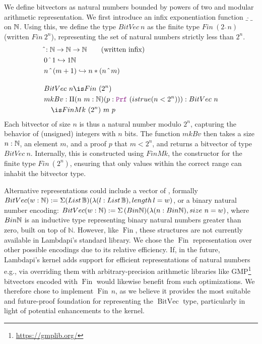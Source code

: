 \begin{definition}[Bitvector]\label{def:bv-def}
We define bitvectors as natural numbers bounded by powers of two and modular arithmetic representation.
We first introduce an infix exponentiation function $\_\,\hat{}\,\_$ on $\mathbb{N}$.
Using this, we define the type $BitVec~n$ as the finite type $Fin~(2~\hat~n)$ (written $Fin~2^n$), representing the set of natural numbers strictly less than $2^n$.
\begin{align*}
& \hat{}: \N \ra \N \ra \N \qquad \text{(written inﬁx)}\\
& 0 ~\hat{}~ 1 \re 1 \N\\
& n ~\hat{}~ (m + 1) \re n * (n ~\hat{}~ m)\\[1em]
&BitVec~n \is Fin~(2^n) \\
& mkBv: \Pi(n~m: \N)(p: \prf~(istrue(n < 2^n))): BitVec~n\\
&\quad\is FinMk~(2^n)~m~p
\end{align*}
Each bitvector of size $n$ is thus a natural number modulo $2^n$, capturing the behavior of (unsigned) integers with $n$ bits.
The function $mkBv$ then takes a size $n: \mathbb{N}$, an element $m$, and a proof $p$ that $m < 2^n$, and returns a bitvector of type $BitVec~n$.
Internally, this is constructed using $FinMk$, the constructor for the finite type $Fin~(2^n)$, ensuring that only values within the correct range can inhabit the bitvector type.
\end{definition}

Alternative representations could include a vector of \B{},
formally $\mathop{BitVec}(w: \mathbb{N}) := \Sigma(\mathop{List\,\mathbb{B}})(\lambda(l: \mathop{List\,\mathbb{B}}),\mathop{length}l = w)$,
or a binary natural number encoding: $\mathop{BitVec}(w: \mathbb{N}) := \Sigma\,(\mathop{Bin\mathbb{N}})(\lambda (n:\mathop{Bin\mathbb{N}}), \mathop{size}\,n = w)$, where $\mathop{Bin\mathbb{N}}$
is an inductive type representing binary natural numbers greater than zero, built on top of $\mathbb{N}$.
However, like $\mathop{Fin}$, these structures are not currently available in Lambdapi's standard library.
We chose the $\mathop{Fin}$ representation over other possible encodings due to its relative efficiency.
If, in the future, Lambdapi's kernel adds support for efficient representations of natural numbers e.g.,
via overriding them with arbitrary-precision arithmetic libraries like GMP\footnote{\url{https://gmplib.org/}} bitvectors encoded with $\mathop{Fin}$ would likewise benefit from such optimizations.
We therefore chose to implement $\mathop{Fin}\,n$, as we believe it provides the most suitable and future-proof foundation for representing the $\mathop{BitVec}$ type,
particularly in light of potential enhancements to the kernel.



